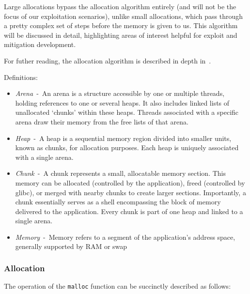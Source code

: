 \documentclass{article}
\begin{document}
Large allocations bypass the allocation algorithm entirely (and will not be the focus of our exploitation scenarios), unlike small allocations, which pass through a pretty complex set of steps before the memory is given to us. This algorithm will be discussed in detail, highlighting areas of interest helpful for exploit and mitigation development.

For futher reading, the allocation algorithm is described in depth in~\cite{MallocInternals}.

Definitions:
\begin{itemize}
  \item \emph{Arena}~-~An arena is a structure accessible by one or multiple threads, holding references to one or several heaps. It also includes linked lists of unallocated `chunks' within these heaps. Threads associated with a specific arena draw their memory from the free lists of that arena.
  \item \emph{Heap}~-~A heap is a sequential memory region divided into smaller units, known as chunks, for allocation purposes. Each heap is uniquely associated with a single arena.
  \item \emph{Chunk}~-~A chunk represents a small, allocatable memory section. This memory can be allocated (controlled by the application), freed (controlled by glibc), or merged with nearby chunks to create larger sections. Importantly, a chunk essentially serves as a shell encompassing the block of memory delivered to the application. Every chunk is part of one heap and linked to a single arena.
  \item \emph{Memory}~-~Memory refers to a segment of the application's address space, generally supported by RAM or swap
\end{itemize}

\subsubsection{Allocation}
The operation of the \texttt{malloc} function can be succinctly described as follows:
\end{document}
